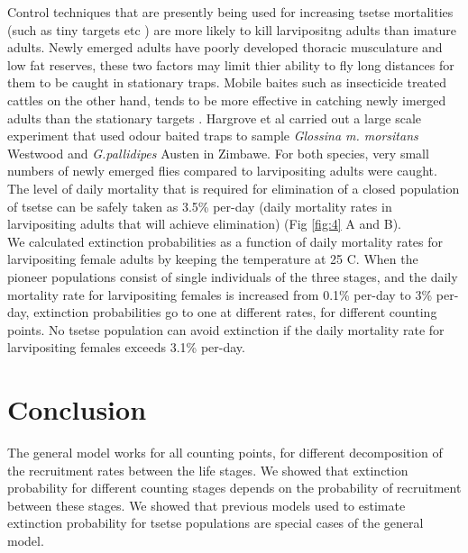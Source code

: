 \documentclass[smallextended]{svjour3}
\begin{document}
Control techniques that are presently being used for increasing tsetse mortalities (such as tiny targets etc \cite{Hargrove2000,Esterhuizen2006,Shaw2015,Mbewe2018a}) are more likely to kill larvipositng adults than imature adults. Newly emerged adults have poorly developed thoracic musculature and low fat reserves, these two factors may limit thier ability to fly long distances for them to be caught in stationary traps. Mobile baites such as insecticide treated cattles on the other hand, tends to be more effective in catching newly imerged adults than the stationary targets \cite{Hargrove1991}. Hargrove et al \cite{HargroveJ.W.HollowayM.T.P.ValeG.A.GoughA.J.E.Hall1995} carried out a large scale experiment that used  odour baited traps to sample  {\it Glossina m. morsitans} Westwood and {\it G.pallidipes} Austen in Zimbawe. For both species, very small numbers of newly emerged flies compared to larvipositing adults were caught. The level of daily mortality that is required for elimination of a closed population of tsetse can be safely taken as 3.5\% per-day (daily mortality rates in larvipositing adults that will achieve elimination) (Fig \ref{fig:4} A and B).  \\


We calculated extinction probabilities as a function of daily mortality rates for larvipositing female adults by keeping the temperature at 25 \degree C. When the pioneer populations consist of single individuals of the three stages, and the daily mortality rate for larvipositing females is increased from 0.1\% per-day to 3\% per-day, extinction probabilities go to one at different rates, for different counting points. No tsetse population can avoid extinction if the daily mortality rate for larvipositing females exceeds 3.1\% per-day\cite{Are2019}.




 



\section{Conclusion}

The general model works for all counting points, for different decomposition of the recruitment rates between the life stages. We showed that extinction probability for different counting stages depends on the probability of recruitment between these stages. We showed that previous models used to estimate extinction probability for tsetse populations are special cases of the general model. \\
\end{document}
